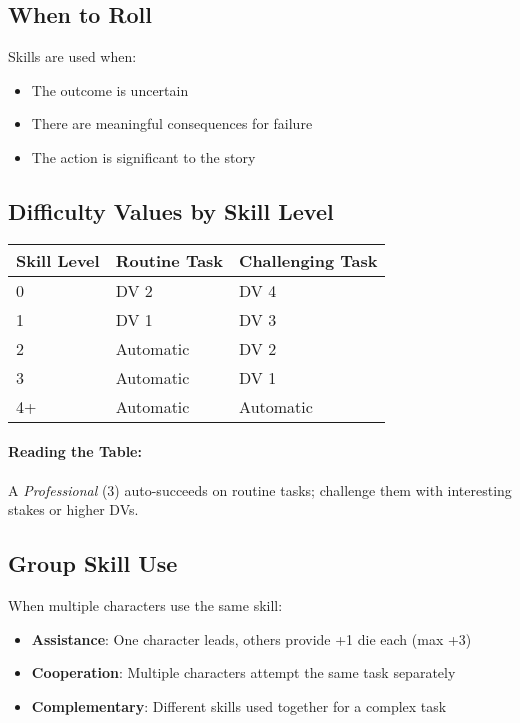\subsection*{When to Roll}
Skills are used when:
\begin{itemize}
\item The outcome is uncertain
\item There are meaningful consequences for failure
\item The action is significant to the story
\end{itemize}

\subsection*{Difficulty Values by Skill Level}
\begin{center}
\small
\begin{tabular}{lll}
\toprule
\textbf{Skill Level} & \textbf{Routine Task} & \textbf{Challenging Task} \\
\midrule
0 & DV 2 & DV 4 \\
1 & DV 1 & DV 3 \\
2 & Automatic & DV 2 \\
3 & Automatic & DV 1 \\
4+ & Automatic & Automatic \\
\bottomrule
\end{tabular}
\end{center}

\paragraph{Reading the Table:}
A \emph{Professional} (3) auto-succeeds on routine tasks; challenge them with interesting stakes or higher DVs.

\subsection*{Group Skill Use}
When multiple characters use the same skill:
\begin{itemize}
\item \textbf{Assistance}: One character leads, others provide +1 die each (max +3)
\item \textbf{Cooperation}: Multiple characters attempt the same task separately
\item \textbf{Complementary}: Different skills used together for a complex task
\end{itemize}

